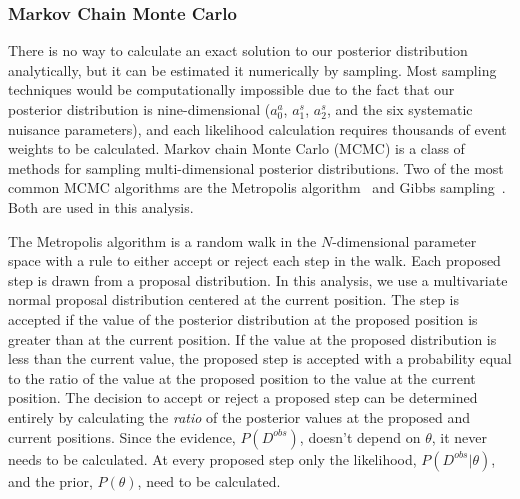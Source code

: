   \subsubsection{Markov Chain Monte Carlo}\label{sec:mcmc}
    There is no way to calculate an exact solution to our posterior
    distribution analytically, but it can be estimated it numerically by
    sampling. Most sampling techniques would be computationally impossible due
    to the fact that our posterior distribution is nine-dimensional ($a_0^a$,
    $a_1^s$, $a_2^s$, and the six systematic nuisance parameters), and each
    likelihood calculation requires thousands of event weights to be
    calculated.  Markov chain Monte Carlo (MCMC) is a class of methods for
    sampling multi-dimensional posterior distributions. Two of the most common
    MCMC algorithms are the Metropolis algorithm~\cite{Metropolis:1953am} and
    Gibbs sampling~\cite{Geman:1987}. Both are used in this analysis.

    The Metropolis algorithm is a random walk in the $N$-dimensional parameter
    space with a rule to either accept or reject each step in the walk. Each
    proposed step is drawn from a proposal distribution.  In this analysis, we
    use a multivariate normal proposal distribution centered at the current
    position.  The step is accepted if the value of the posterior distribution
    at the proposed position is greater than at the current position. If the
    value at the proposed distribution is less than the current value, the
    proposed step is accepted with a probability equal to the ratio of the
    value at the proposed position to the value at the current position. The
    decision to accept or reject a proposed step can be determined entirely by
    calculating the \textit{ratio} of the posterior values at the proposed and
    current positions. Since the evidence, $P(D^{obs})$, doesn't depend on
    $\theta$, it never needs to be calculated. At every proposed step only the
    likelihood, $P(D^{obs}|\theta)$, and the prior, $P(\theta)$, need to be
    calculated.

